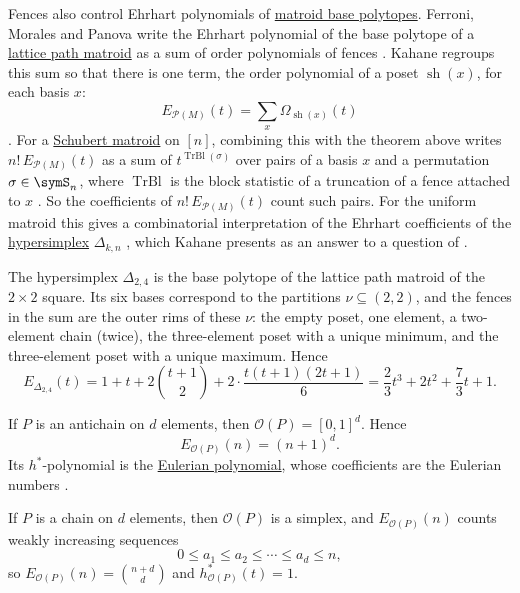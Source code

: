 Fences also control Ehrhart polynomials of
\hyperref[matroidBasePolytope]{matroid base polytopes}.
Ferroni, Morales and Panova write the Ehrhart polynomial of the base polytope
of a \hyperref[latticePathMatroidDefinition]{lattice path matroid} as a sum of
order polynomials of fences \cite{FerroniMoralesPanova2026x}.  Kahane
regroups this sum so that there is one term, the order polynomial of a poset
\(\operatorname{sh}(x)\), for each basis \(x\):
\[
  E_{\mathcal P(M)}(t)=\sum_{x}\Omega_{\operatorname{sh}(x)}(t)
\]
\cite[Cor.~6.5]{Kahane2026x}.  For a
\hyperref[schubertMatroidDefinition]{Schubert matroid} on \([n]\), combining
this with the theorem above writes \(n!\,E_{\mathcal P(M)}(t)\) as a sum of
\(t^{\operatorname{TrBl}(\sigma)}\) over pairs of a basis \(x\) and a
permutation \(\sigma\in\symS_n\), where \(\operatorname{TrBl}\) is the block
statistic of a truncation of a fence attached to \(x\)
\cite[Thm.~6.8]{Kahane2026x}.  So the coefficients of
\(n!\,E_{\mathcal P(M)}(t)\) count such pairs.  For the uniform matroid this
gives a combinatorial interpretation of the Ehrhart coefficients of the
\hyperref[hypersimplex]{hypersimplex} \(\Delta_{k,n}\)
\cite[Prop.~6.9]{Kahane2026x}, which Kahane presents as an answer to a
question of .

\begin{example}
The hypersimplex \(\Delta_{2,4}\) is the base polytope of the lattice path
matroid of the \(2\times 2\) square.  Its six bases correspond to the
partitions \(\nu\subseteq(2,2)\), and the fences in the sum are the outer rims
of these \(\nu\): the empty poset, one element, a two-element chain (twice),
the three-element poset with a unique minimum, and the three-element poset
with a unique maximum.  Hence
\[
  E_{\Delta_{2,4}}(t)
  =1+t+2\binom{t+1}{2}+2\cdot\frac{t(t+1)(2t+1)}{6}
  =\frac23t^3+2t^2+\frac73t+1.
\]
\end{example}

\begin{example}
If \(P\) is an antichain on \(d\) elements, then
\(\mathcal O(P)=[0,1]^d\).  Hence
\[
  E_{\mathcal O(P)}(n)=(n+1)^d.
\]
Its \(h^*\)-polynomial is the
\hyperref[eulerianPolynomial]{Eulerian polynomial}, whose coefficients are
the Eulerian numbers .

If \(P\) is a chain on \(d\) elements, then
\(\mathcal O(P)\) is a simplex, and \(E_{\mathcal O(P)}(n)\) counts weakly
increasing sequences
\[
  0\leq a_1\leq a_2\leq \dotsb \leq a_d\leq n,
\]
so \(E_{\mathcal O(P)}(n)=\binom{n+d}{d}\) and \(h^*_{\mathcal O(P)}(t)=1\).
\end{example}

